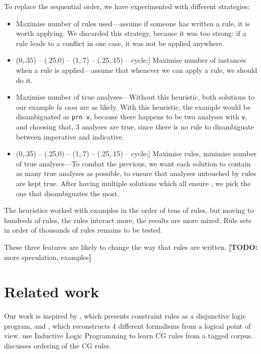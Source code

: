 \documentclass[11pt]{article}
\newcommand{\todo}[1]{{\color{cyan}\textbf{[TODO: }#1\textbf{]}}}
\def\checkmark{\tikz\fill[scale=0.4](0,.35) -- (.25,0) -- (1,.7) -- (.25,.15) -- cycle;}
\begin{document}
To replace the sequential order, we have experimented with different strategies:
\begin{itemize}
\item Maximise number of rules used---assume if someone has written a rule, it is worth applying. We discarded this strategy, because it was too strong: if a rule leads to a conflict in one case, it was not be applied anywhere.
\item [\checkmark] Maximise number of instances when a rule is applied---assume that whenever we can apply a rule, we should do it. 
\item Maximise number of true analyses---Without this heuristic, both solutions to our example \emph{la casa} are as likely. With this heuristic,  the example would be disambiguated as \texttt{prn v}, because there happens to be two analyses with \texttt{v}, and choosing that, 3 analyses are true, since there is no rule to disambiguate between imperative and indicative.
\item [\checkmark] Maximise rules, minimise number of true analyses---To combat the previous, we want each solution to contain as many true analyses as possible, to ensure that analyses untouched by rules are kept true. After having multiple solutions which all ensure , we pick the one that disambiguates the most.

\end{itemize}

The heuristics worked with examples in the order of tens of rules, but moving to hundreds of rules, the rules interact more, the results are more mixed. 
Rule sets in order of thousands of rules remains to be tested.


These three features are likely to change the way that rules are written. \todo{more speculation, examples}


\section{Related work}
\label{sect:related}

Our work is inspired by \cite{lager98}, which presents constraint rules as a disjunctive logic program,
and \cite{lager_nivre01}, which reconstructs 4 different formalisms from a logical point of view.
\cite{lindberg_eineborg98ilp,asfrent14} use Inductive Logic Programming to learn CG rules from a tagged corpus.
\cite{lager01transformation} discusses ordering of the CG rules.
\end{document}
